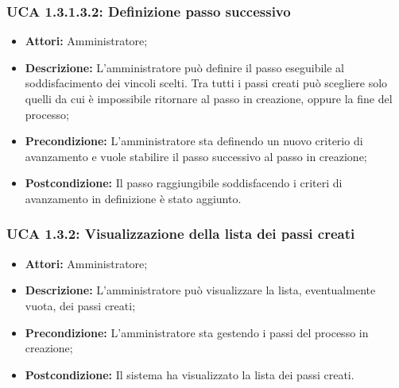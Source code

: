 \subsubsection{UCA 1.3.1.3.2: Definizione passo successivo}
\begin{itemize}
\item \textbf{Attori:}
Amministratore;
\item \textbf{Descrizione:}
L'amministratore può definire il passo eseguibile al soddisfacimento dei vincoli scelti. Tra tutti i passi creati può scegliere solo quelli da cui è impossibile ritornare al passo in creazione, oppure la fine del processo;
\item \textbf{Precondizione:}
L'amministratore sta definendo un nuovo criterio di avanzamento e vuole stabilire il passo successivo al passo in creazione;
\item \textbf{Postcondizione:}
Il passo raggiungibile soddisfacendo i criteri di avanzamento in definizione è stato aggiunto.
\end{itemize}

\hypertarget{A1.3.2}{}
\subsubsection{UCA 1.3.2: Visualizzazione della lista dei passi creati}
\begin{itemize}
\item \textbf{Attori:}
Amministratore;
\item \textbf{Descrizione:}
L'amministratore può visualizzare la lista, eventualmente vuota, dei passi creati;
\item \textbf{Precondizione:}
L'amministratore sta gestendo i passi del processo in creazione;
\item \textbf{Postcondizione:}
Il sistema ha visualizzato la lista dei passi creati.
\end{itemize}

\hypertarget{A1.3.3}{}
